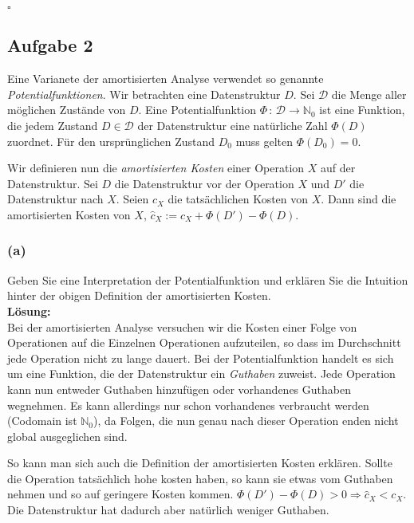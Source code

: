 \documentclass[11pt,a4paper,ngerman]{article}
\begin{document}
\mbox{}\hfill$\square$

\subsection*{Aufgabe 2}

Eine Varianete der amortisierten Analyse verwendet so genannte \emph{Potentialfunktionen}. Wir betrachten eine Datenstruktur $D$. Sei $\mathcal{D}$ die Menge aller möglichen Zustände von $D$. Eine Potentialfunktion $\Phi \, : \, \mathcal{D} \rightarrow \mathbb{N}_0$ ist eine Funktion, die jedem Zustand $D \in \mathcal{D}$ der Datenstruktur eine natürliche Zahl $\Phi(D)$ zuordnet. Für den ursprünglichen Zustand $D_0$ muss gelten $\Phi(D_0) = 0$. 

Wir definieren nun die \emph{amortisierten Kosten} einer Operation $X$ auf der Datenstruktur. Sei $D$ die Datenstruktur vor der Operation $X$ und $D'$ die Datenstruktur nach $X$. Seien $c_X$ die tatsächlichen Kosten von $X$. Dann sind die amortisierten Kosten von $X$, $\hat{c}_X := c_X + \Phi(D') - \Phi(D)$.

\subsubsection*{(a)}

Geben Sie eine Interpretation der Potentialfunktion und erklären Sie die Intuition hinter der obigen Definition der amortisierten Kosten.\\

\noindent\textbf{Lösung:}\\

Bei der amortisierten Analyse versuchen wir die Kosten einer Folge von Operationen auf die Einzelnen Operationen aufzuteilen, so dass im Durchschnitt jede Operation nicht zu lange dauert. Bei der Potentialfunktion handelt es sich um eine Funktion, die der Datenstruktur ein \emph{Guthaben} zuweist. Jede Operation kann nun entweder Guthaben hinzufügen oder vorhandenes Guthaben wegnehmen. Es kann allerdings nur schon vorhandenes verbraucht werden (Codomain ist $\mathbb{N}_0$), da Folgen, die nun genau nach dieser Operation enden nicht global ausgeglichen sind.

So kann man sich auch die Definition der amortisierten Kosten erklären. Sollte die Operation tatsächlich hohe kosten haben, so kann sie etwas vom Guthaben nehmen und so auf geringere Kosten kommen.
$\Phi(D') - \Phi(D) > 0 \Rightarrow \hat{c}_X < c_X$. Die Datenstruktur hat dadurch aber natürlich weniger Guthaben.
\end{document}

